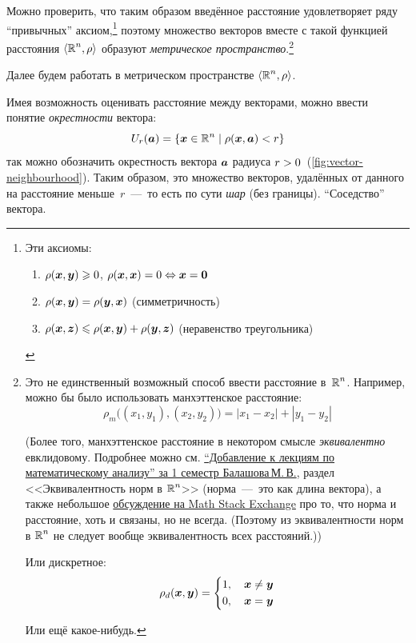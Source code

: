 \documentclass[a4paper,12pt]{article}
\begin{document}
  Можно проверить, что таким образом введённое расстояние удовлетворяет ряду ``привычных'' аксиом,\footnote{
    Эти аксиомы:
    \begin{enumerate}
      \item $\rho(\boldsymbol x, \boldsymbol y) \geqslant 0$, $\rho(\boldsymbol x, \boldsymbol x) = 0 \Leftrightarrow \boldsymbol x = \boldsymbol 0$
      \item $\rho(\boldsymbol x, \boldsymbol y) = \rho(\boldsymbol y, \boldsymbol x)$ (симметричность)
      \item $\rho(\boldsymbol x, \boldsymbol z) \leqslant \rho(\boldsymbol x, \boldsymbol y) + \rho(\boldsymbol y, \boldsymbol z)$ (неравенство треугольника)
    \end{enumerate}
  } поэтому множество векторов вместе с такой функцией расстояния $\langle\operatorname{\mathbb R}^n, \rho\rangle$ образуют \emph{метрическое пространство}.\footnote{
    Это не единственный возможный способ ввести расстояние в~$\operatorname{\mathbb R}^n$.
    Например, можно бы было использовать манхэттенское расстояние:
    \[
      \rho_m\bigl((x_1, y_1), (x_2, y_2)\bigr) = |x_1 - x_2| + |y_1 - y_2|
    \]

    (Более того, манхэттенское расстояние в некотором смысле \emph{эквивалентно} евклидовому.
    Подробнее можно см. \href{https://mipt.ru/institute-departments/kafedra-vysshey-matematiki/study_docs/books_lections}{``Добавление к лекциям по математическому анализу'' за 1 семестр Балашова\,М.\,В.}, раздел <<Эквивалентность норм в $\operatorname{\mathbb R}^n$>> (норма~---~это как длина вектора), а также небольшое \href{https://math.stackexchange.com/questions/172028/difference-between-norm-and-distance}{обсуждение на Math Stack Exchange} про то, что норма и расстояние, хоть и связаны, но не всегда.
    (Поэтому из эквивалентности норм в $\operatorname{\mathbb R}^n$ не следует вообще эквивалентность всех расстояний.))

    Или дискретное:
    \[
      \rho_d(\boldsymbol x, \boldsymbol y) = \left\{
        \begin{aligned}
          1,\quad \boldsymbol x \not= \boldsymbol y\\
          0,\quad \boldsymbol x = \boldsymbol y
        \end{aligned}
      \right.
    \]

    Или ещё какое-нибудь.
  }

  Далее будем работать в метрическом пространстве $\langle\operatorname{\mathbb R}^n, \rho\rangle$.

  Имея возможность оценивать расстояние между векторами, можно ввести понятие \emph{окрестности} вектора:
  \[
    U_{r}(\boldsymbol a) = \{\boldsymbol x \in \operatorname{\mathbb R}^n \mid \rho(\boldsymbol x, \boldsymbol a) < r\}
  \]
  так можно обозначить окрестность вектора $\boldsymbol a$ радиуса $r \hm> 0$~(\ref{fig:vector-neighbourhood}).
  Таким образом, это множество векторов, удалённых от данного на расстояние меньше~$r$~---~то есть по сути \emph{шар} (без границы).
  ``Соседство'' вектора.
\end{document}
